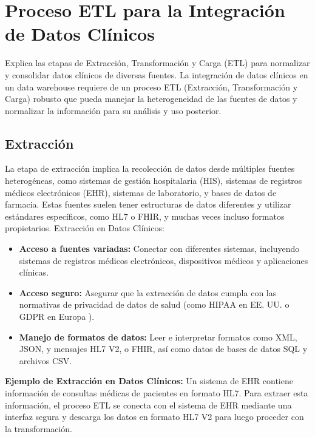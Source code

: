 \documentclass[12pt, a4paper, twoside]{article}
\begin{document}
	
	\section{Proceso ETL para la Integración de Datos Clínicos}
	Explica las etapas de Extracción, Transformación y Carga (ETL) para normalizar y consolidar datos clínicos de diversas fuentes.
	La integración de datos clínicos en un data warehouse requiere de un proceso ETL (Extracción, Transformación y Carga) robusto que pueda manejar la heterogeneidad de las fuentes de datos y normalizar la información para su análisis y uso posterior.
	
	\subsection{Extracción}
	La etapa de extracción implica la recolección de datos desde múltiples fuentes heterogéneas, como sistemas de gestión hospitalaria (HIS), sistemas de registros médicos electrónicos (EHR), sistemas de laboratorio, y bases de datos de farmacia. Estas fuentes suelen tener estructuras de datos diferentes y utilizar estándares específicos, como HL7 o FHIR, y muchas veces incluso formatos propietarios\cite{keepcodingExtraccion}.
	Extracción en Datos Clínicos:
	\begin{itemize}
		\item \textbf{Acceso a fuentes variadas:} Conectar con diferentes sistemas, incluyendo sistemas de registros médicos electrónicos, dispositivos médicos y aplicaciones clínicas.
		
		\item \textbf{Acceso seguro:} Asegurar que la extracción de datos cumpla con las normativas de privacidad de datos de salud (como HIPAA en EE. UU. \cite{fbiHIPAA} o GDPR en Europa \cite{comisionEUDataProtection}).
		
		\item \textbf{Manejo de formatos de datos:} Leer e interpretar formatos como XML, JSON, y mensajes HL7 V2, o FHIR, así como datos de bases de datos SQL y archivos CSV.
	\end{itemize}
	
	\textbf{Ejemplo de Extracción en Datos Clínicos:} Un sistema de EHR contiene información de consultas médicas de pacientes en formato HL7. Para extraer esta información, el proceso ETL se conecta con el sistema de EHR mediante una interfaz segura y descarga los datos en formato HL7 V2 para luego proceder con la transformación.
	
\end{document}
